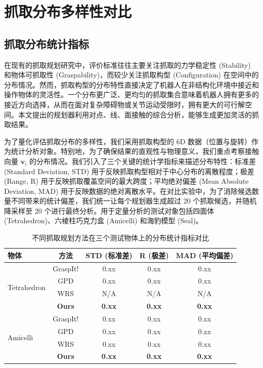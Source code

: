 \section{抓取分布多样性对比}
\label{sec:distribution_comparison}

\subsection{抓取分布统计指标}
在现有的抓取规划研究中，评价标准往往主要关注抓取的力学稳定性 (Stability) 和物体可抓取性 (Graspability)，而较少关注抓取构型 (Configuration) 在空间中的分布情况。然而，抓取构型的分布特性直接决定了机器人在非结构化环境中接近和操作物体的灵活性。一个分布更广泛、更均匀的抓取集合意味着机器人拥有更多的接近方向选择，从而在面对复杂障碍物或关节运动受限时，拥有更大的可行解空间。本文提出的规划器利用对点、线、面接触的综合分析，能够生成更加灵活的抓取结果。

为了量化评估抓取分布的多样性，我们采用抓取构型的 6D 数据（位置与旋转）作为统计分析对象。特别地，为了确保结果的直观性与物理意义，我们重点考察接触向量 $\mathbf{v}_i$ 的分布情况。我们引入了三个关键的统计学指标来描述分布特性：标准差 (Standard Deviation, STD) 用于反映抓取构型相对于中心分布的离散程度；极差 (Range, R) 用于反映抓取覆盖空间的最大跨度；平均绝对偏差 (Mean Absolute Deviation, MAD) 用于反映数据的绝对离散水平。在对比实验中，为了消除候选数量不同带来的统计偏差，我们统一让每个规划器生成超过 20 个抓取候选，并随机降采样至 20 个进行最终分析。用于定量分析的测试对象包括四面体 (Tetrahedron)、六棱柱巧克力盒 (Amicelli) 和海豹模型 (Seal)。

\begin{table}[htbp]
    \centering
    \caption{不同抓取规划方法在三个测试物体上的分布统计指标对比}
    \label{tab:distribution_metrics}
    \begin{tabular}{lcccc}
        \toprule
        \textbf{物体} & \textbf{方法} & \textbf{STD (标准差)} & \textbf{R (极差)} & \textbf{MAD (平均偏差)} \\
        \midrule
        \multirow{4}{*}{Tetrahedron} 
        & GraspIt! & 0.xx & 0.xx & 0.xx \\
        & GPD & 0.xx & 0.xx & 0.xx \\
        & WRS & N/A & N/A & N/A \\
        & \textbf{Ours} & \textbf{0.xx} & \textbf{0.xx} & \textbf{0.xx} \\
        \midrule
        \multirow{4}{*}{Amicelli} 
        & GraspIt! & 0.xx & 0.xx & 0.xx \\
        & GPD & 0.xx & 0.xx & 0.xx \\
        & WRS & 0.xx & 0.xx & 0.xx \\
        & \textbf{Ours} & \textbf{0.xx} & \textbf{0.xx} & \textbf{0.xx} \\
        \bottomrule
    \end{tabular}
\end{table}

